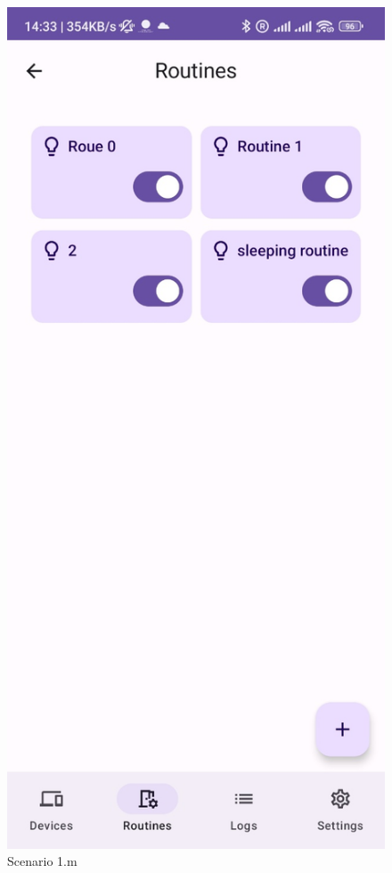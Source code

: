 \begin{enumerate}
\begin{enumerate}
\begin{figure}
            \centering
            \includegraphics[width=0.5\linewidth]{imgs//usercase/usercase_scenario1_13.jpg}
            \caption{Scenario 1.m}
            \label{fig:enter-label}
        \end{figure}
    \end{enumerate}


\end{enumerate}
